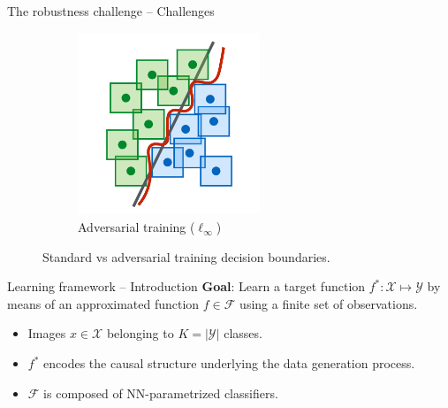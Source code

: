 \begin{frame}{The robustness challenge -- Challenges}
\begin{figure}
		\hfill
		\begin{subfigure}[t]{0.32\textwidth}
			\centering
			\includegraphics[width=0.6\textwidth]{img/introduction//adversarial_complexity_3.png}
			\caption{Adversarial training ($\ell_\infty$)}
		\end{subfigure}
		   \caption{
			Standard vs adversarial training decision boundaries. \cite{madryDeepLearningModels2019}
		   }
		   \label{fig:adversarial_complexity}
	\end{figure}
\end{frame}

\begin{frame}
    \centering
    \Huge{\insertsection}  %
\end{frame}

\begin{frame}{Learning framework -- Introduction}
	\textbf{Goal}: Learn a target function $f^*: \mathcal{X} \longmapsto \mathcal{Y}$ 
	by means of an approximated function $f \in \mathcal{F}$ using a 
	finite set of observations. 
	\vspace{0.5cm}

	\begin{itemize}
		\item Images $x \in \mathcal{X}$ belonging to $K = |\mathcal{Y}|$ classes.
		\item $f^*$ encodes the causal structure underlying the data generation process.
		\item $\mathcal{F}$ is composed of NN-parametrized classifiers.
	\end{itemize}
\end{frame}


